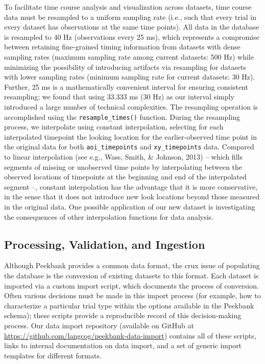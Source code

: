 \documentclass[
  english,
  man,floatsintext]{apa6}
\begin{document}
To facilitate time course analysis and visualization across datasets, time course data must be resampled to a uniform sampling rate (i.e., such that every trial in every dataset has observations at the same time points).
All data in the database is resampled to 40 Hz (observations every 25 ms), which represents a compromise between retaining fine-grained timing information from datasets with dense sampling rates (maximum sampling rate among current datasets: 500 Hz) while minimizing the possibility of introducing artifacts via resampling for datasets with lower sampling rates (minimum sampling rate for current datasets: 30 Hz).
Further, 25 ms is a mathematically convenient interval for ensuring consistent resampling; we found that using 33.333 ms (30 Hz) as our interval simply introduced a large number of technical complexities.
The resampling operation is accomplished using the \texttt{resample\_times()} function.
During the resampling process, we interpolate using constant interpolation, selecting for each interpolated timepoint the looking location for the earlier-observed time point in the original data for both \texttt{aoi\_timepoints} and \texttt{xy\_timepoints} data.
Compared to linear interpolation (see e.g., Wass, Smith, \& Johnson, 2013) -- which fills segments of missing or unobserved time points by interpolating between the observed locations of timepoints at the beginning and end of the interpolated segment --, constant interpolation has the advantage that it is more conservative, in the sense that it does not introduce new look locations beyond those measured in the original data.
One possible application of our new dataset is investigating the consequences of other interpolation functions for data analysis.

\hypertarget{processing-validation-and-ingestion}{%
\subsection{Processing, Validation, and Ingestion}\label{processing-validation-and-ingestion}}

Although Peekbank provides a common data format, the crux issue of populating the database is the conversion of existing datasets to this format.
Each dataset is imported via a custom import script, which documents the process of conversion.
Often various decisions must be made in this import process (for example, how to characterize a particular trial type within the options available in the Peekbank schema); these scripts provide a reproducible record of this decision-making process. Our data import repository (available on GitHub at \url{https://github.com/langcog/peekbank-data-import}) contains all of these scripts, links to internal documentation on data import, and a set of generic import templates for different formats.
\end{document}
